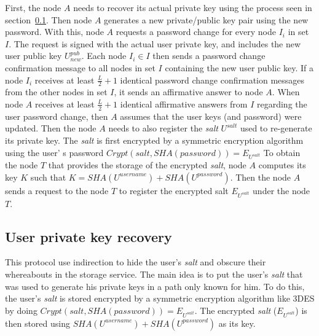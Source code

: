 First, the node $A$ needs to recover its actual private key using the process
seen in section~\ref{sec:private_key_recovery}. Then node $A$ generates a new private/public
key pair using the new password.  With this, node $A$ requests a
password change for every node $I_i$ in set $I$. The request is signed with the
actual user private key, and includes the new user public key $U^{pub}_{new}$.
Each node $I_i \in I$ then sends a password change confirmation message to all nodes
in set $I$ containing the new user public key. If a node $I_i$ receives at
least $\frac{L}{2} + 1$ identical password change confirmation messages from
the other nodes in set $I$, it sends an affirmative answer to node $A$.
 When node $A$ receives at least $\frac{L}{2} + 1$ identical affirmative
answers from $I$ regarding the user password change, then $A$ assumes that the
user keys (and password) were updated.
Then the node $A$ needs to also register the \textit{salt} $U^{salt}$ used to
re-generate its private key. The \textit{salt} is first encrypted by a symmetric encryption algorithm
using the user' s password $Crypt(salt, SHA(password)) = E_{U^{salt}}$
To obtain the node $T$ that provides the storage of the encrypted \textit{salt},
node $A$ computes its key $K$ such that $K = SHA(U^{username})+SHA(U^{password})$.
Then the node $A$ sends a request to the node $T$ to register the
encrypted salt $E_{U^{salt}}$ under the node $T$.

\subsection{User private key recovery}
\label{sec:private_key_recovery}

This protocol use indirection to hide the user's
\textit{salt} and obscure their whereabouts in the storage service.
The main idea is to put the user's \textit{salt} that was used to generate his private keys in a
path only known for him. To do this, the user's \textit{salt} is stored encrypted
by a symmetric encryption algorithm like 3DES by doing $Crypt(salt,
SHA(password)) = E_{U^{salt}}$. The encrypted \textit{salt} ($E_{U^{salt}}$) is
then stored using $SHA(U^{username})+SHA(U^{password})$ as its key.

